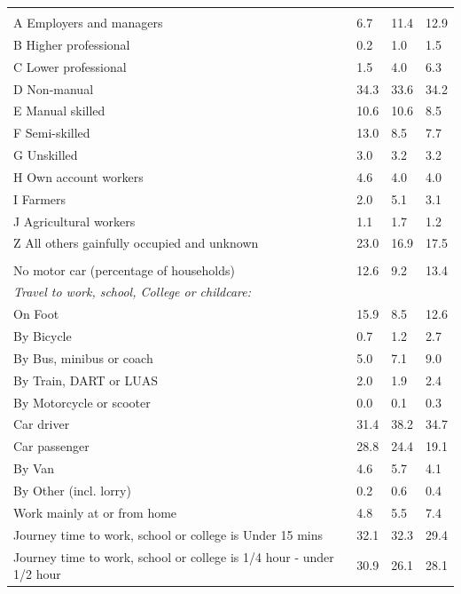 \documentclass{article}
\begin{document}
\begin{table}[h]
\begin{tabular}{KTTT}
\hline
    \\ 
    \hline
A Employers and managers &  6.7& 11.4& 12.9\\
B Higher professional & 0.2& 1.0& 1.5\\
C Lower professional & 1.5& 4.0& 6.3\\
D Non-manual & 34.3& 33.6& 34.2\\
E Manual skilled & 10.6& 10.6&  8.5\\
F Semi-skilled & 13.0&  8.5&  7.7\\
G Unskilled & 3.0& 3.2& 3.2\\
H Own account workers & 4.6& 4.0& 4.0\\
I Farmers & 2.0& 5.1& 3.1\\
J Agricultural workers & 1.1& 1.7& 1.2\\
Z All others gainfully occupied and unknown & 23.0& 16.9& 17.5\\
\hline
{}\hline
    \\ 
    \hline
No motor car (percentage of households) & 12.6&  9.2& 
13.4\\
    \hline
\emph{Travel to work, school, College or childcare:} & & & \\
\quad On Foot & 15.9&  8.5& 12.6\\
\quad By Bicycle & 0.7& 1.2& 2.7\\
\quad By Bus, minibus or coach & 5.0& 7.1& 9.0\\
\quad By Train, DART or LUAS & 2.0& 1.9& 2.4\\
\quad By Motorcycle or scooter & 0.0& 0.1& 0.3\\
\quad Car driver & 31.4& 38.2& 34.7\\
\quad Car passenger & 28.8& 24.4& 19.1\\
\quad By Van & 4.6& 5.7& 4.1\\
\quad By Other (incl. lorry) & 0.2& 0.6& 0.4\\
    \hline
Work mainly at or from home & 4.8& 5.5& 7.4\\
Journey time to work, school or college is Under 15 mins & 32.1& 32.3& 29.4\\
Journey time to work, school or college is 1/4 hour - under 1/2 hour & 30.9& 26.1& 28.1\\

\end{tabular}
\end{table}
\end{document}
